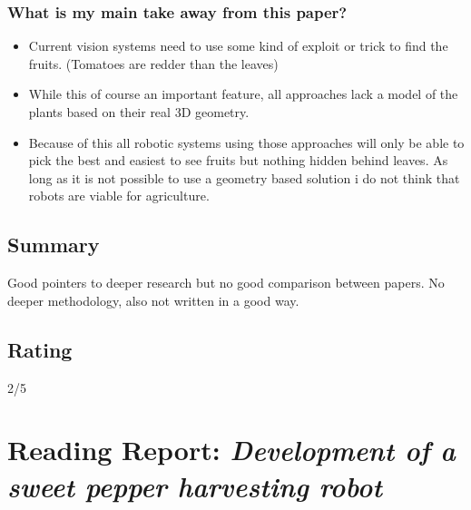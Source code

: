 \documentclass{article}
\begin{document}
\subsubsection*{What is my main take away from this paper?}
\begin{itemize}
    \item Current vision systems need to use some kind of exploit or trick to find the fruits. (Tomatoes are redder than the leaves) 
    \item While this of course an important feature, all approaches lack a model of the plants based on their real 3D geometry. 
    \item Because of this all robotic systems using those approaches will only be able to pick the best and easiest to see fruits but nothing hidden behind leaves. As long as it is not possible to use a geometry based solution i do not think that robots are viable for agriculture.
\end{itemize}

\subsection*{Summary}
Good pointers to deeper research but no good comparison between papers. No deeper methodology, also not written in a good way.
\subsection*{Rating}
2/5


\section{Reading Report: \emph{Development of a sweet pepper harvesting robot}}
\cite{Arad2020}
\end{document}
